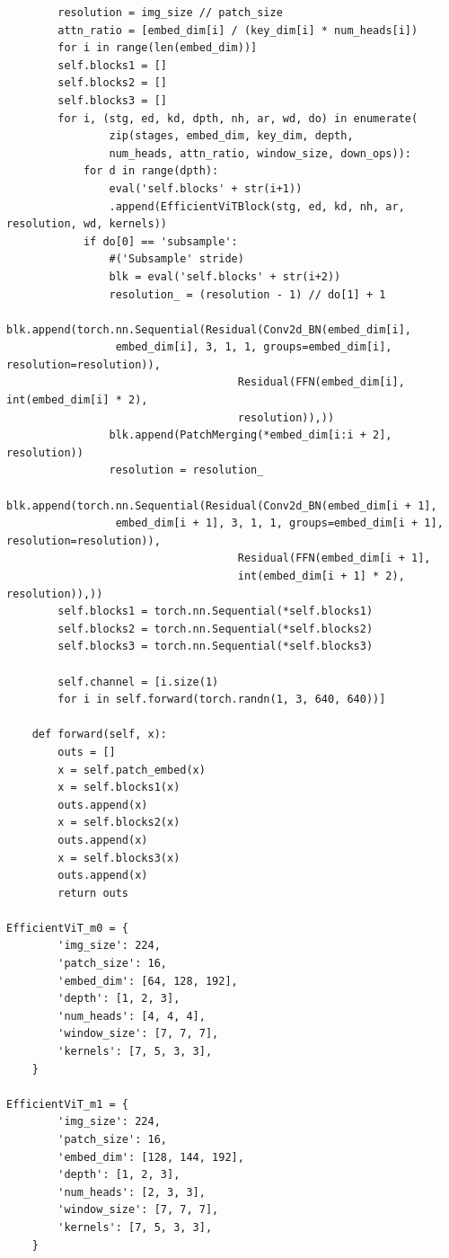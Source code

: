 \documentclass[12pt]{ctexart}
\begin{document}
\begin{lstlisting}
        resolution = img_size // patch_size
        attn_ratio = [embed_dim[i] / (key_dim[i] * num_heads[i]) 
        for i in range(len(embed_dim))]
        self.blocks1 = []
        self.blocks2 = []
        self.blocks3 = []
        for i, (stg, ed, kd, dpth, nh, ar, wd, do) in enumerate(
                zip(stages, embed_dim, key_dim, depth, 
                num_heads, attn_ratio, window_size, down_ops)):
            for d in range(dpth):
                eval('self.blocks' + str(i+1))
                .append(EfficientViTBlock(stg, ed, kd, nh, ar, resolution, wd, kernels))
            if do[0] == 'subsample':
                #('Subsample' stride)
                blk = eval('self.blocks' + str(i+2))
                resolution_ = (resolution - 1) // do[1] + 1
                blk.append(torch.nn.Sequential(Residual(Conv2d_BN(embed_dim[i],
                 embed_dim[i], 3, 1, 1, groups=embed_dim[i], resolution=resolution)),
                                    Residual(FFN(embed_dim[i], int(embed_dim[i] * 2), 
                                    resolution)),))
                blk.append(PatchMerging(*embed_dim[i:i + 2], resolution))
                resolution = resolution_
                blk.append(torch.nn.Sequential(Residual(Conv2d_BN(embed_dim[i + 1],
                 embed_dim[i + 1], 3, 1, 1, groups=embed_dim[i + 1], resolution=resolution)),
                                    Residual(FFN(embed_dim[i + 1], 
                                    int(embed_dim[i + 1] * 2), resolution)),))
        self.blocks1 = torch.nn.Sequential(*self.blocks1)
        self.blocks2 = torch.nn.Sequential(*self.blocks2)
        self.blocks3 = torch.nn.Sequential(*self.blocks3)
        
        self.channel = [i.size(1) 
        for i in self.forward(torch.randn(1, 3, 640, 640))]
 
    def forward(self, x):
        outs = []
        x = self.patch_embed(x)
        x = self.blocks1(x)
        outs.append(x)
        x = self.blocks2(x)
        outs.append(x)
        x = self.blocks3(x)
        outs.append(x)
        return outs
 
EfficientViT_m0 = {
        'img_size': 224,
        'patch_size': 16,
        'embed_dim': [64, 128, 192],
        'depth': [1, 2, 3],
        'num_heads': [4, 4, 4],
        'window_size': [7, 7, 7],
        'kernels': [7, 5, 3, 3],
    }
 
EfficientViT_m1 = {
        'img_size': 224,
        'patch_size': 16,
        'embed_dim': [128, 144, 192],
        'depth': [1, 2, 3],
        'num_heads': [2, 3, 3],
        'window_size': [7, 7, 7],
        'kernels': [7, 5, 3, 3],
    }
 

\end{lstlisting}
\end{document}
